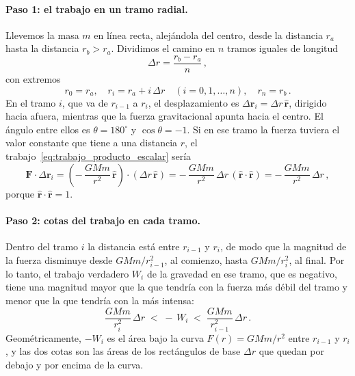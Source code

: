 \paragraph{Paso 1: el trabajo en un tramo radial.}
Llevemos la masa $m$ en línea recta, alejándola del centro, desde la distancia
$r_{a}$ hasta la distancia $r_{b} > r_{a}$. Dividimos el camino en $n$ tramos
iguales de longitud
\begin{equation}
  \Delta r = \frac{r_{b} - r_{a}}{n} \,,
  \label{eq:ancho_tramo}
\end{equation}
con extremos
\begin{equation}
  r_{0} = r_{a}, \quad
  r_{i} = r_{a} + i\,\Delta r \quad (i = 0, 1, \dots, n), \quad
  r_{n} = r_{b} \,.
  \label{eq:extremos_tramos}
\end{equation}
En el tramo $i$, que va de $r_{i-1}$ a $r_{i}$, el desplazamiento es
$\Delta\boldsymbol{r}_{i} = \Delta r\,\hat{\boldsymbol{r}}$, dirigido hacia
afuera, mientras que la fuerza gravitacional apunta hacia el centro. El ángulo
entre ellos es $\theta = 180^{\circ}$ y $\cos\theta = -1$. Si en ese tramo la
fuerza tuviera el valor constante que tiene a una distancia $r$, el
trabajo~\eqref{eq:trabajo_producto_escalar} sería
\begin{equation}
  \boldsymbol{F}\cdot\Delta\boldsymbol{r}_{i}
  = \left(-\,\frac{GMm}{r^{2}}\,\hat{\boldsymbol{r}}\right)
    \cdot\left(\Delta r\,\hat{\boldsymbol{r}}\right)
  = -\,\frac{GMm}{r^{2}}\,\Delta r\,
    \left(\hat{\boldsymbol{r}}\cdot\hat{\boldsymbol{r}}\right)
  = -\,\frac{GMm}{r^{2}}\,\Delta r \,,
  \label{eq:trabajo_tramo_fuerza_fija}
\end{equation}
porque $\hat{\boldsymbol{r}}\cdot\hat{\boldsymbol{r}} = 1$.

\paragraph{Paso 2: cotas del trabajo en cada tramo.}
Dentro del tramo $i$ la distancia está entre $r_{i-1}$ y $r_{i}$, de modo que
la magnitud de la fuerza disminuye desde $GMm/r_{i-1}^{2}$, al comienzo,
hasta $GMm/r_{i}^{2}$, al final. Por lo tanto, el trabajo verdadero $W_{i}$
de la gravedad en ese tramo, que es negativo, tiene una magnitud mayor que la
que tendría con la fuerza más débil del tramo y menor que la que tendría con
la más intensa:
\begin{equation}
  \frac{GMm}{r_{i}^{2}}\,\Delta r
  \;<\; -\,W_{i} \;<\;
  \frac{GMm}{r_{i-1}^{2}}\,\Delta r \,.
  \label{eq:cotas_trabajo_tramo}
\end{equation}
Geométricamente, $-W_{i}$ es el área bajo la curva $F(r) = GMm/r^{2}$ entre
$r_{i-1}$ y $r_{i}$, y las dos cotas son las áreas de los rectángulos de base
$\Delta r$ que quedan por debajo y por encima de la curva.

